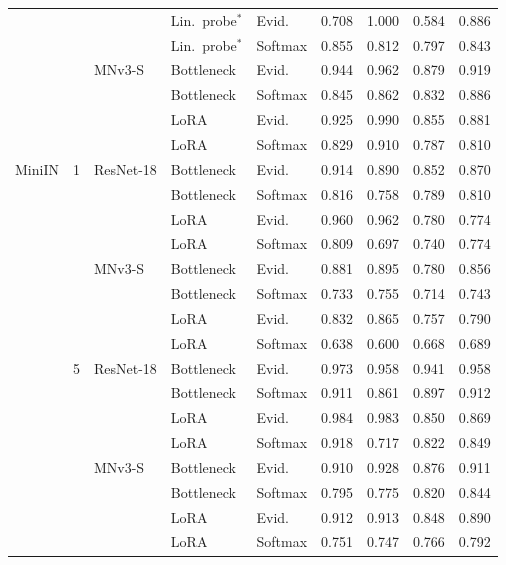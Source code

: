 \begin{longtable}{@{}lllllrrrr@{}}
 &  &  & Lin.\ probe$^\ast$ & Evid. & 0.708 & 1.000 & 0.584 & 0.886 \\
 &  &  & Lin.\ probe$^\ast$ & Softmax & 0.855 & 0.812 & 0.797 & 0.843 \\
 &  & MNv3-S & Bottleneck & Evid. & 0.944 & 0.962 & 0.879 & 0.919 \\
 &  &  & Bottleneck & Softmax & 0.845 & 0.862 & 0.832 & 0.886 \\
 &  &  & LoRA & Evid. & 0.925 & 0.990 & 0.855 & 0.881 \\
 &  &  & LoRA & Softmax & 0.829 & 0.910 & 0.787 & 0.810 \\
MiniIN & 1 & ResNet-18 & Bottleneck & Evid. & 0.914 & 0.890 & 0.852 & 0.870 \\
 &  &  & Bottleneck & Softmax & 0.816 & 0.758 & 0.789 & 0.810 \\
 &  &  & LoRA & Evid. & 0.960 & 0.962 & 0.780 & 0.774 \\
 &  &  & LoRA & Softmax & 0.809 & 0.697 & 0.740 & 0.774 \\
 &  & MNv3-S & Bottleneck & Evid. & 0.881 & 0.895 & 0.780 & 0.856 \\
 &  &  & Bottleneck & Softmax & 0.733 & 0.755 & 0.714 & 0.743 \\
 &  &  & LoRA & Evid. & 0.832 & 0.865 & 0.757 & 0.790 \\
 &  &  & LoRA & Softmax & 0.638 & 0.600 & 0.668 & 0.689 \\
 & 5 & ResNet-18 & Bottleneck & Evid. & 0.973 & 0.958 & 0.941 & 0.958 \\
 &  &  & Bottleneck & Softmax & 0.911 & 0.861 & 0.897 & 0.912 \\
 &  &  & LoRA & Evid. & 0.984 & 0.983 & 0.850 & 0.869 \\
 &  &  & LoRA & Softmax & 0.918 & 0.717 & 0.822 & 0.849 \\
 &  & MNv3-S & Bottleneck & Evid. & 0.910 & 0.928 & 0.876 & 0.911 \\
 &  &  & Bottleneck & Softmax & 0.795 & 0.775 & 0.820 & 0.844 \\
 &  &  & LoRA & Evid. & 0.912 & 0.913 & 0.848 & 0.890 \\
 &  &  & LoRA & Softmax & 0.751 & 0.747 & 0.766 & 0.792 \\
\end{longtable}
\endgroup


